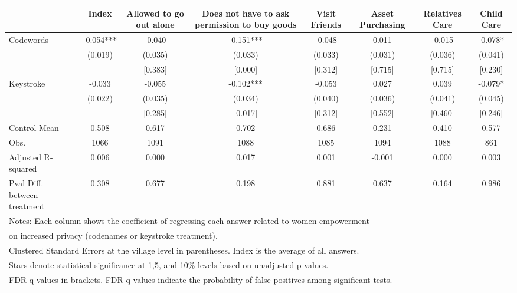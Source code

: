 {
\def\sym#1{\ifmmode^{#1}\else\(^{#1}\)\fi}
\begin{tabular}{l*{7}{c}}
\toprule
                &\multicolumn{1}{c}{Index}&\multicolumn{1}{c}{Allowed to go out alone}&\multicolumn{1}{c}{Does not have to ask permission to buy goods}&\multicolumn{1}{c}{Visit Friends}&\multicolumn{1}{c}{Asset Purchasing}&\multicolumn{1}{c}{Relatives Care}&\multicolumn{1}{c}{Child Care}\\
\midrule
Codewords       &   -0.054***&   -0.040   &   -0.151***&   -0.048   &    0.011   &   -0.015   &   -0.078*  \\
                &  (0.019)   &  (0.035)   &  (0.033)   &  (0.033)   &  (0.031)   &  (0.036)   &  (0.041)   \\
                &            &  [0.383]   &  [0.000]   &  [0.312]   &  [0.715]   &  [0.715]   &  [0.230]   \\
Keystroke       &   -0.033   &   -0.055   &   -0.102***&   -0.053   &    0.027   &    0.039   &   -0.079*  \\
                &  (0.022)   &  (0.035)   &  (0.034)   &  (0.040)   &  (0.036)   &  (0.041)   &  (0.045)   \\
                &            &  [0.285]   &  [0.017]   &  [0.312]   &  [0.552]   &  [0.460]   &  [0.246]   \\
\midrule
Control Mean    &    0.508   &    0.617   &    0.702   &    0.686   &    0.231   &    0.410   &    0.577   \\
Obs.            &     1066   &     1091   &     1088   &     1085   &     1094   &     1088   &      861   \\
Adjusted R-squared&    0.006   &    0.000   &    0.017   &    0.001   &   -0.001   &    0.000   &    0.003   \\
Pval Diff. between treatment&    0.308   &    0.677   &    0.198   &    0.881   &    0.637   &    0.164   &    0.986   \\
\bottomrule
\multicolumn{8}{l}{\footnotesize Notes: Each column shows the coefficient of regressing each answer related to women empowerment}\\
\multicolumn{8}{l}{\footnotesize on increased privacy (codenames or keystroke treatment).}\\
\multicolumn{8}{l}{\footnotesize Clustered Standard Errors at the village level in parentheses. Index is the average of all answers.}\\
\multicolumn{8}{l}{\footnotesize Stars denote statistical significance at 1,5, and 10\% levels based on unadjusted p-values.}\\
\multicolumn{8}{l}{\footnotesize FDR-q values in brackets. FDR-q values indicate the probability of false positives among significant tests.}\\
\end{tabular}
}
